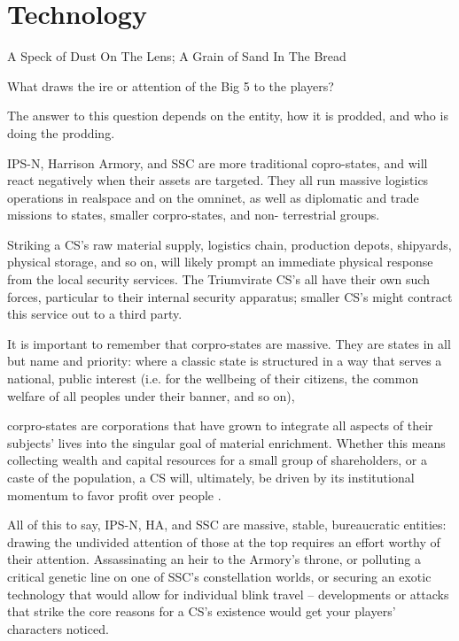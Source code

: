 \chapter{Technology}
A Speck of Dust On The Lens; A Grain of Sand In The Bread  
   
What draws the ire or attention of the Big 5 to the players?   

The answer to this question depends on the entity, how it is prodded, and who is doing the  
prodding.   

IPS-N, Harrison Armory, and SSC are more traditional copro-states, and will react negatively  
when their assets are targeted. They all run massive logistics operations in realspace and on the  
omninet, as well as diplomatic and trade missions to states, smaller corpro-states, and non- 
terrestrial groups.   

Striking a CS’s raw material supply, logistics chain, production depots, shipyards, physical  
storage, and so on, will likely prompt an immediate physical response from the local security  
services. The Triumvirate CS’s all have their own such forces, particular to their internal security  
apparatus; smaller CS’s might contract this service out to a third party.   

It is important to remember that corpro-states are massive. They are states in all but name and  
priority: where a classic state is structured in a way that serves a national, public interest (i.e. for  
the wellbeing of their citizens, the common welfare of all peoples under their banner, and so on),  

                                                                                                                  


corpro-states are corporations that have grown to integrate all aspects of their subjects’ lives into  
the singular goal of material enrichment. Whether this means collecting wealth and capital  
resources for a small group of shareholders, or a caste of the population, a CS will, ultimately, be  
driven by its institutional momentum to favor profit over people .   

All of this to say, IPS-N, HA, and SSC are massive, stable, bureaucratic entities: drawing the  
undivided attention of those at the top requires an effort worthy of their attention. Assassinating an  
heir to the Armory’s throne, or polluting a critical genetic line on one of SSC’s constellation worlds,  
or securing an exotic technology that would allow for individual blink travel -- developments or  
attacks that strike the core reasons for a CS’s existence would get your players’ characters  
noticed.      

